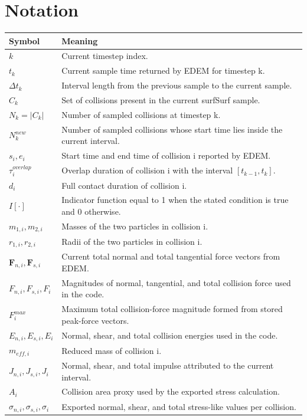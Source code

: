 \documentclass[11pt,a4paper]{article}
\begin{document}
\section*{Notation}
\begin{longtable}{@{}L{0.22\textwidth}L{0.70\textwidth}@{}}
\toprule
\textbf{Symbol} & \textbf{Meaning}\\
\midrule
\endhead
$k$ & Current timestep index.\\
$t_k$ & Current sample time returned by EDEM for timestep k.\\
$\Delta t_k$ & Interval length from the previous sample to the current sample.\\
$C_k$ & Set of collisions present in the current surfSurf sample.\\
$N_k = |C_k|$ & Number of sampled collisions at timestep k.\\
$N_k^{new}$ & Number of sampled collisions whose start time lies inside the current interval.\\
$s_i, e_i$ & Start time and end time of collision i reported by EDEM.\\
$\tau_i^{overlap}$ & Overlap duration of collision i with the interval $[t_{k-1}, t_k]$.\\
$d_i$ & Full contact duration of collision i.\\
$I[\cdot]$ & Indicator function equal to 1 when the stated condition is true and 0 otherwise.\\
$m_{1,i}, m_{2,i}$ & Masses of the two particles in collision i.\\
$r_{1,i}, r_{2,i}$ & Radii of the two particles in collision i.\\
$\mathbf{F}_{n,i}, \mathbf{F}_{s,i}$ & Current total normal and total tangential force vectors from EDEM.\\
$F_{n,i}, F_{s,i}, F_i$ & Magnitudes of normal, tangential, and total collision force used in the code.\\
$F_i^{max}$ & Maximum total collision-force magnitude formed from stored peak-force vectors.\\
$E_{n,i}, E_{s,i}, E_i$ & Normal, shear, and total collision energies used in the code.\\
$m_{eff,i}$ & Reduced mass of collision i.\\
$J_{n,i}, J_{s,i}, J_i$ & Normal, shear, and total impulse attributed to the current interval.\\
$A_i$ & Collision area proxy used by the exported stress calculation.\\
$\sigma_{n,i}, \sigma_{s,i}, \sigma_i$ & Exported normal, shear, and total stress-like values per collision.\\

\end{longtable}
\end{document}
